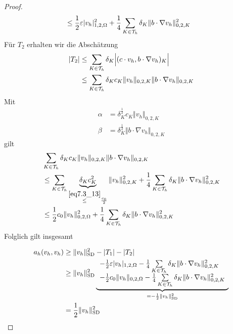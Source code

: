 \begin{proof}
\begin{align*}
		&\leq\frac{1}{2}\varepsilon|v_h|^2_{1,2,\Omega}+\frac{1}{4}\sum\limits_{K\in\mathcal{T}_h}\delta_K\Vert b\cdot\nabla v_h\Vert^2_{0,2,K}
	\end{align*}
	Für $T_2$ erhalten wir die Abschätzung
	\begin{align*}
		|T_2|
		&\leq\sum\limits_{K\in\mathcal{T}_h}\delta_K\Big|(c \cdot v_h,b\cdot\nabla v_h)_K\Big|\\
		&\leq\sum\limits_{K\in\mathcal{T}_h}\delta_K c_K\Vert v_h\Vert_{0,2,K}\Vert b\cdot\nabla v_h\Vert_{0,2,K}
	\end{align*}
	Mit
	\begin{align*}
		\alpha&=\delta_K^{\frac{1}{2}}c_K\Vert v_h\Vert_{0,2,K}\\
		\beta&=\delta_K^{\frac{1}{2}}\Vert b\cdot\nabla v_h\Vert_{0,2,K}
	\end{align*}
	gilt
	\begin{align*}
		&\sum\limits_{K\in\mathcal{T}_h}\delta_K c_K\Vert v_h\Vert_{0,2,K}\Vert b\cdot\nabla v_h\Vert_{0,2,K} \\
		&\leq\sum\limits_{K\in\mathcal{T}_h}\underbrace{\delta_K c_K^2}_{\overset{\eqref{eq7.3_13}}{\leq}\frac{c_0}{2}}\Vert v_h\Vert^2_{0,2,K}+\frac{1}{4}\sum\limits_{K\in\mathcal{T}_h}\delta_K\Vert b\cdot\nabla v_h\Vert^2_{0,2,K}\\
		&\leq\frac{1}{2}c_0\Vert v_h\Vert^2_{0,2,\Omega}+\frac{1}{4}\sum\limits_{K\in\mathcal{T}_h}\delta_K\Vert b\cdot\nabla v_h\Vert^2_{0,2,K}
	\end{align*}
	Folglich gilt insgesamt

	\begin{align*}
		a_h(v_h,v_h)
		&\geq\Vert v_h\Vert^2_{\text{SD}}-|T_1| -|T_2| \\
		&\geq\Vert v_h\Vert^2_{\text{SD}}\underbrace{
			\begin{array}{l}
				-\frac{1}{2}\varepsilon\vert v_h\vert_{1,2,\Omega}
			-\frac{1}{4}\sum\limits_{K\in\mathcal{T}_h}\delta_K\Vert b\cdot\nabla v_h\Vert^2_{0,2,K}\\
			-\frac{1}{2}c_0\Vert v_h\Vert_{0,2,\Omega}
			-\frac{1}{4}\sum\limits_{K\in\mathcal{T}_h}\delta_K\Vert b\cdot\nabla v_h\Vert^2_{0,2,K}
			\end{array}
			}_{=-\frac{1}{2}\Vert v_h\Vert_{\text{SD}}^2}\\
		&=\frac{1}{2}\Vert v_h\Vert^2_{\text{SD}}
	\end{align*}
\end{proof}

